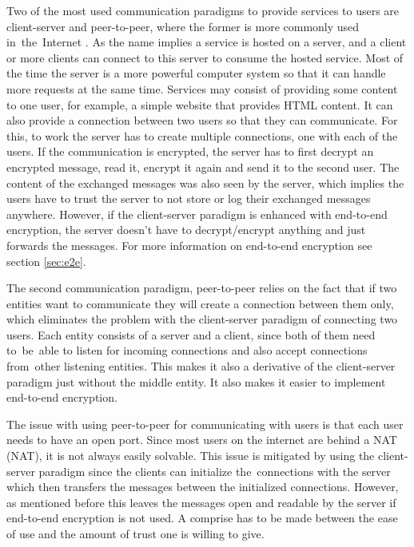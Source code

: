 Two of the most used communication paradigms to provide services to users are client-server and peer-to-peer, where the former is more commonly used in~the~Internet \cite{Forouzan2010}. As the name implies a service is hosted on a server, and a client or more clients can connect to this server to consume the hosted service. Most of the time the server is a more powerful computer system so that it can handle more requests at the same time. Services may consist of providing some content to one user, for example, a simple website that provides HTML content. It can also provide a connection between two users so that they can communicate. For this, to work the server has to create multiple connections, one with each of the users. If the communication is encrypted, the server has to first decrypt an encrypted message, read it, encrypt it again and send it to the second user. The content of the exchanged messages was also seen by the server, which implies the users have to trust the server to not store or log their exchanged messages anywhere. However, if the client-server paradigm is enhanced with end-to-end encryption, the server doesn't have to decrypt/encrypt anything and just forwards the messages. For more information on end-to-end encryption see section \ref{sec:e2e}.

The second communication paradigm, peer-to-peer relies on the fact that if two entities want to communicate they will create a connection between them only, which eliminates the problem with the client-server paradigm of connecting two users. Each entity consists of a server and a client, since both of them need to~be~able to listen for incoming connections and also accept connections from~other listening entities. This makes it also a derivative of the client-server paradigm just without the middle entity. It also makes it easier to implement end-to-end encryption.

The issue with using peer-to-peer for communicating with users is that each user needs to have an open port. Since most users on the internet are behind a NAT (\acl{NAT}), it is not always easily solvable. This issue is mitigated by using the client-server paradigm since the clients can initialize the~connections with the server which then transfers the messages between the initialized connections. However, as mentioned before this leaves the messages open and readable by the server if end-to-end encryption is not used. A comprise has to be made between the ease of use and the amount of trust one is willing to give.
